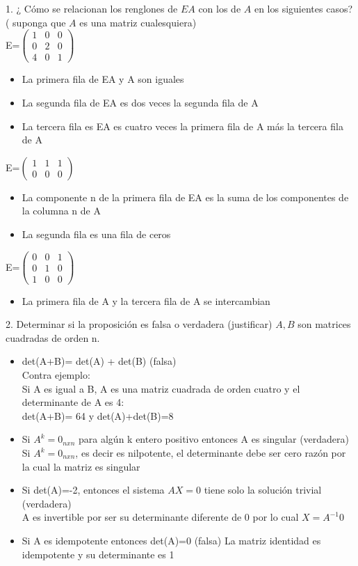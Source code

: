 1. ¿ Cómo se relacionan los renglones de $EA$ con los de $A$ en los siguientes casos? ( suponga que $A$ es una matriz cualesquiera)\\

E=$\begin{pmatrix}
 1& 0& 0 \\
 0& 2& 0 \\ 
 4& 0& 1 
\end{pmatrix}$\\
\begin{itemize}
\item La primera fila de EA y A son iguales 
\item La segunda fila de EA es dos veces la segunda fila de A
\item La tercera fila es EA es cuatro veces la primera fila de A más la tercera fila de A
\end{itemize}
E=$\begin{pmatrix}
 1& 1& 1 \\
 0& 0& 0 
\end{pmatrix}$\\
\begin{itemize}
\item La componente n de la primera fila de EA es la suma de los componentes de la columna n de A
\item La segunda fila es una fila de ceros 
\end{itemize}
E=$\begin{pmatrix}
 0& 0& 1 \\
 0& 1& 0 \\
 1& 0& 0
\end{pmatrix}$\\
\begin{itemize}
\item La primera fila de A y la tercera fila de A se intercambian 
\end{itemize}
2. Determinar si la proposición es falsa o verdadera (justificar) $A,B$ son matrices cuadradas de orden n.\\
\begin{itemize}
\item det(A+B)= det(A) + det(B) (falsa)\\

Contra ejemplo: \\
Si A es igual a B, A es una matriz cuadrada de orden cuatro y el determinante de A es 4:\\
det(A+B)= 64 y det(A)+det(B)=8 
\item Si $A^{k} = 0_{nxn}$ para algún k entero positivo entonces A es singular (verdadera)\\
Si $A^{k} = 0_{nxn}$, es decir es nilpotente, el determinante debe ser cero razón por la cual la matriz es singular
\item Si det(A)=-2, entonces el sistema $AX=0$ tiene solo la solución trivial (verdadera)\\
A es invertible por ser su determinante diferente de 0 por lo cual $X= A^{-1} 0$
\item Si A es idempotente entonces det(A)=0 (falsa)
La matriz identidad es idempotente y su determinante es 1
\end{itemize}
